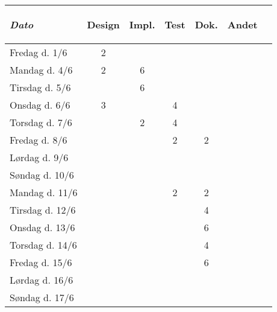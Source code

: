 \documentclass[a4paper]{article}
\begin{document}
\begin{tabular}{l | c c c c c | c}

  \emph{Dato}
  & \begin{sideways}Design\end{sideways} 
  & \begin{sideways}Impl.\end{sideways} 
  & \begin{sideways}Test\end{sideways} 
  & \begin{sideways}Dok.\end{sideways} 
  & \begin{sideways}Andet\end{sideways} \\
  \hline
  Fredag d. 1/6   & 2 &   &   &   & \\
  Mandag d. 4/6   & 2 & 6 &   &   & \\
  Tirsdag d. 5/6  &   & 6 &   &   & \\
  Onsdag d. 6/6   & 3 &   & 4 &   & \\
  Torsdag d. 7/6  &   & 2 & 4 &   & \\
  Fredag d. 8/6   &   &   & 2 & 2 & \\
  Lørdag d. 9/6   &   &   &   &   & \\
  Søndag d. 10/6  &   &   &   &   & \\
  Mandag d. 11/6  &   &   & 2 & 2 & \\
  Tirsdag d. 12/6 &   &   &   & 4 & \\
  Onsdag d. 13/6  &   &   &   & 6 & \\
  Torsdag d. 14/6 &   &   &   & 4 & \\
  Fredag d. 15/6  &   &   &   & 6 & \\
  Lørdag d. 16/6  &   &   &   &   & \\
  Søndag d. 17/6  &   &   &   &   & \\

\end{tabular}


\end{document}
